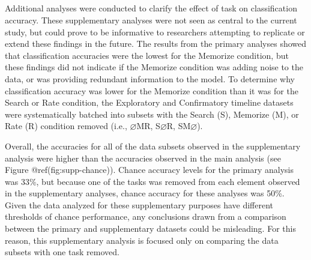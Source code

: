 \clearpage
\makeatletter
\efloat@restorefloats
\makeatother


\begin{appendix}
\hypertarget{section}{%
\section{}\label{section}}

Additional analyses were conducted to clarify the effect of task on
classification accuracy. These supplementary analyses were not seen as
central to the current study, but could prove to be informative to
researchers attempting to replicate or extend these findings in the
future. The results from the primary analyses showed that classification
accuracies were the lowest for the Memorize condition, but these
findings did not indicate if the Memorize condition was adding noise to
the data, or was providing redundant information to the model. To
determine why classification accuracy was lower for the Memorize
condition than it was for the Search or Rate condition, the Exploratory
and Confirmatory timeline datasets were systematically batched into
subsets with the Search (S), Memorize (M), or Rate (R) condition removed
(i.e., \(\varnothing\)MR, S\(\varnothing\)R, SM\(\varnothing\)).

Overall, the accuracies for all of the data subsets observed in the
supplementary analysis were higher than the accuracies observed in the
main analysis (see Figure @ref(fig:supp-chance)). Chance accuracy levels
for the primary analysis was 33\%, but because one of the tasks was
removed from each element observed in the supplementary analyses, chance
accuracy for these analyses was 50\%. Given the data analyzed for these
supplementary purposes have different thresholds of chance performance,
any conclusions drawn from a comparison between the primary and
supplementary datasets could be misleading. For this reason, this
supplementary analysis is focused only on comparing the data subsets
with one task removed.


\end{appendix}
